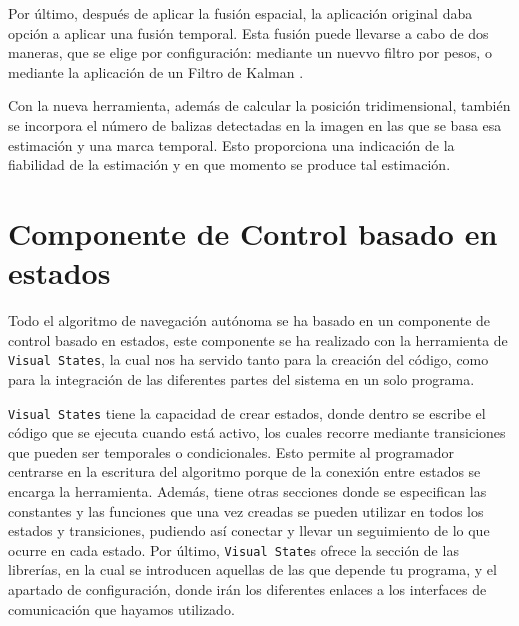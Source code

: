 \hspace{1cm} Por último, después de aplicar la fusión espacial, la aplicación original daba opción a aplicar una fusión temporal. Esta fusión puede llevarse a cabo de dos maneras, que se elige por configuración: mediante un nuevvo filtro por pesos, o mediante la aplicación de un Filtro de Kalman \cite{FiltroKalman}.

\hspace{1cm} Con la nueva herramienta, además de calcular la posición tridimensional, también se incorpora el número de balizas detectadas en la imagen en las que se basa esa estimación y una marca temporal. Esto proporciona una indicación de la fiabilidad de la
estimación y en que momento se produce tal estimación.

\section{Componente de Control basado en estados}
\hspace{1cm} Todo el algoritmo de navegación autónoma se ha basado en un componente de control basado en estados, este componente se ha realizado con la herramienta de \texttt{Visual States}, la cual nos ha servido tanto para la creación del código, como para la integración de las diferentes partes del sistema en un solo programa. 

\hspace{1cm} \texttt{Visual States} tiene la capacidad de crear estados, donde dentro se escribe el código que se ejecuta cuando está activo, los cuales recorre mediante transiciones que pueden ser temporales o condicionales. Esto permite al programador centrarse en la escritura del algoritmo porque de la conexión entre estados se encarga la herramienta. Además, tiene otras secciones donde se especifican las constantes y las funciones que una vez creadas se pueden utilizar en todos los estados y transiciones, pudiendo así conectar y llevar un seguimiento de lo que ocurre en cada estado. Por último, \texttt{Visual State}s ofrece la sección de las librerías, en la cual se introducen aquellas de las que depende tu programa, y el apartado de configuración, donde irán los diferentes enlaces a los interfaces de comunicación que hayamos utilizado. 


